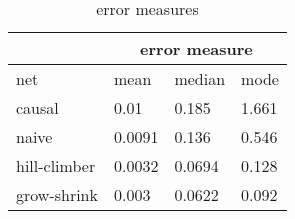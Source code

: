 \begin{table}[h]
\centering
\begin{tabular}{ l l l l }
 \hline
  & \multicolumn{3}{c}{error measure} \\
 \hline
 net & mean & median & mode\\
 \hline
 causal & 0.01& 0.185 & 1.661\\
 naive & 0.0091 & 0.136 & 0.546\\
 hill-climber & 0.0032 & 0.0694 & 0.128\\
 grow-shrink & 0.003 & 0.0622& 0.092\\
\end{tabular}
\caption[Variance]{error measures}
\label{tab:5}
\end{table}